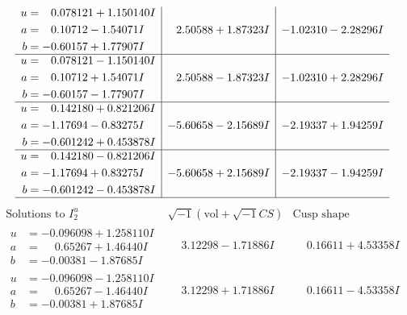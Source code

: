 \documentclass[1p]{elsarticle_modified}
\theoremstyle{definition}
\newcommand{\I}{\sqrt{-1}}
\begin{document}
$$\begin{array}{c|c|c}
\begin{aligned}
u &= \phantom{-}0.078121 + 1.150140 I \\
a &= \phantom{-}0.10712 - 1.54071 I \\
b &= -0.60157 + 1.77907 I\end{aligned}
 & \phantom{-}2.50588 + 1.87323 I & -1.02310 - 2.28296 I \\ \hline\begin{aligned}
u &= \phantom{-}0.078121 - 1.150140 I \\
a &= \phantom{-}0.10712 + 1.54071 I \\
b &= -0.60157 - 1.77907 I\end{aligned}
 & \phantom{-}2.50588 - 1.87323 I & -1.02310 + 2.28296 I \\ \hline\begin{aligned}
u &= \phantom{-}0.142180 + 0.821206 I \\
a &= -1.17694 - 0.83275 I \\
b &= -0.601242 + 0.453878 I\end{aligned}
 & -5.60658 - 2.15689 I & -2.19337 + 1.94259 I \\ \hline\begin{aligned}
u &= \phantom{-}0.142180 - 0.821206 I \\
a &= -1.17694 + 0.83275 I \\
b &= -0.601242 - 0.453878 I\end{aligned}
 & -5.60658 + 2.15689 I & -2.19337 - 1.94259 I\\
 \hline 
 \end{array}$$\newpage$$\begin{array}{c|c|c}  
\text{Solutions to }I^u_{2}& \I (\text{vol} + \sqrt{-1}CS) & \text{Cusp shape}\\
 \hline 
\begin{aligned}
u &= -0.096098 + 1.258110 I \\
a &= \phantom{-}0.65267 + 1.46440 I \\
b &= -0.00381 - 1.87685 I\end{aligned}
 & \phantom{-}3.12298 - 1.71886 I & \phantom{-}0.16611 + 4.53358 I \\ \hline\begin{aligned}
u &= -0.096098 - 1.258110 I \\
a &= \phantom{-}0.65267 - 1.46440 I \\
b &= -0.00381 + 1.87685 I\end{aligned}
 & \phantom{-}3.12298 + 1.71886 I & \phantom{-}0.16611 - 4.53358 I \\ \hline\begin{aligned}

\end{aligned}
\end{array}$$
\end{document}
